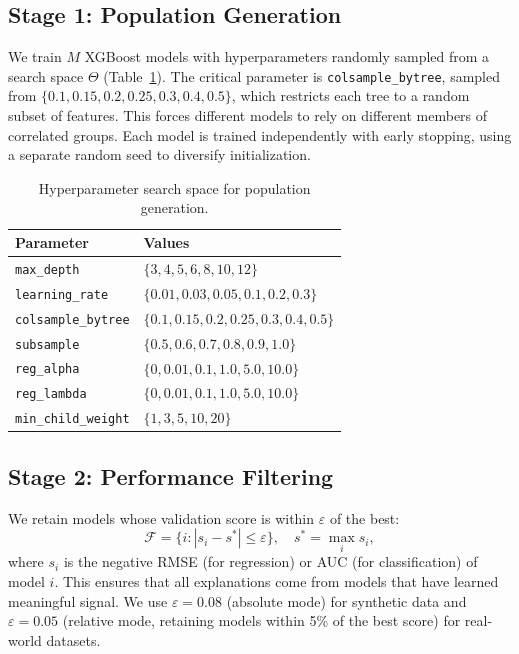 \documentclass[10pt]{article}
\begin{document}
\subsection{Stage 1: Population Generation}

We train $M$ XGBoost \citep{chen2016xgboost} models with hyperparameters randomly sampled from a
search space $\Theta$ (Table~\ref{tab:search_space}). The critical
parameter is \texttt{colsample\_bytree}, sampled from
$\{0.1, 0.15, 0.2, 0.25, 0.3, 0.4, 0.5\}$, which restricts each tree
to a random subset of features. This forces different models to rely on
different members of correlated groups. Each model is trained independently
with early stopping, using a separate random seed to diversify initialization.

\begin{table}[htbp]
\centering
\caption{Hyperparameter search space for population generation.}
\label{tab:search_space}
\begin{tabular}{ll}
\toprule
\textbf{Parameter} & \textbf{Values} \\
\midrule
\texttt{max\_depth}         & $\{3, 4, 5, 6, 8, 10, 12\}$ \\
\texttt{learning\_rate}     & $\{0.01, 0.03, 0.05, 0.1, 0.2, 0.3\}$ \\
\texttt{colsample\_bytree}  & $\{0.1, 0.15, 0.2, 0.25, 0.3, 0.4, 0.5\}$ \\
\texttt{subsample}          & $\{0.5, 0.6, 0.7, 0.8, 0.9, 1.0\}$ \\
\texttt{reg\_alpha}         & $\{0, 0.01, 0.1, 1.0, 5.0, 10.0\}$ \\
\texttt{reg\_lambda}        & $\{0, 0.01, 0.1, 1.0, 5.0, 10.0\}$ \\
\texttt{min\_child\_weight} & $\{1, 3, 5, 10, 20\}$ \\
\bottomrule
\end{tabular}
\end{table}

\subsection{Stage 2: Performance Filtering}

We retain models whose validation score is within $\varepsilon$ of the
best:
\begin{equation}
  \mathcal{F} = \{i : |s_i - s^*| \leq \varepsilon\},
  \quad s^* = \max_i s_i,
  \label{eq:filter}
\end{equation}
where $s_i$ is the negative RMSE (for regression) or AUC (for
classification) of model $i$. This ensures that all explanations come from
models that have learned meaningful signal. We use $\varepsilon = 0.08$
(absolute mode) for synthetic data and $\varepsilon = 0.05$ (relative
mode, retaining models within 5\% of the best score) for real-world
datasets.
\end{document}
